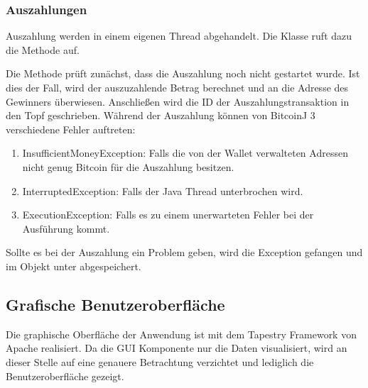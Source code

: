 \subsubsection{Auszahlungen}
Auszahlung werden in einem eigenen Thread abgehandelt. Die Klasse  ruft dazu die  Methode auf.

Die Methode prüft zunächst, dass die Auszahlung noch nicht gestartet wurde. Ist dies der Fall, wird der auszuzahlende Betrag berechnet und an die Adresse des Gewinners überwiesen. Anschließen wird die ID der Auszahlungstransaktion in den Topf geschrieben. Während der Auszahlung können von BitcoinJ 3 verschiedene Fehler auftreten:
\begin{enumerate}
\item InsufficientMoneyException: Falls die von der Wallet verwalteten Adressen nicht genug Bitcoin für die Auszahlung besitzen.
\item InterruptedException: Falls der Java Thread unterbrochen wird.
\item ExecutionException: Falls es zu einem unerwarteten Fehler bei der Ausführung kommt.
\end{enumerate}
Sollte es bei der Auszahlung ein Problem geben, wird die Exception gefangen und im  Objekt unter  abgespeichert.

\subsection{Grafische Benutzeroberfläche}\label{ssec:btc_gui}

Die graphische Oberfläche der Anwendung ist mit dem Tapestry Framework von Apache realisiert. Da die GUI Komponente nur die Daten visualisiert, wird an dieser Stelle auf eine genauere Betrachtung verzichtet und lediglich die Benutzeroberfläche gezeigt.


